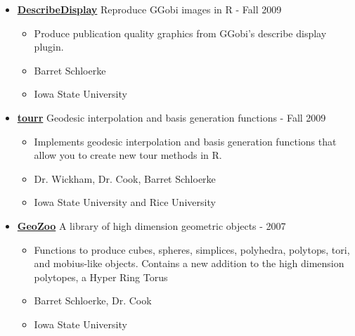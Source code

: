 \documentclass[oneside]{article}
\begin{document}
\begin{itemize}
      \item{\bf \href{http://github.com/ggobi/DescribeDisplay}{DescribeDisplay}} Reproduce GGobi images in R - Fall 2009
        \begin{itemize}
          \item Produce publication quality graphics from GGobi's describe display plugin.
          \item Barret Schloerke
          \item Iowa State University
        \end{itemize}


      \item{\bf \href{http://github.com/ggobi/tourr}{tourr}} Geodesic interpolation and basis generation functions - Fall 2009
        \begin{itemize}
          \item Implements geodesic interpolation and basis generation functions that allow you to create new tour methods in R.
          \item Dr. Wickham, Dr. Cook, Barret Schloerke
          \item Iowa State University and Rice University
        \end{itemize}


      \item{\bf \href{http://streaming.stat.iastate.edu/~dicook/geometric-data/}{GeoZoo}} A library of high dimension geometric objects - 2007
        \begin{itemize}
          \item Functions to produce cubes, spheres, simplices, polyhedra, polytops, tori, and mobius-like objects. Contains a new addition to the high dimension polytopes, a Hyper Ring Torus
          \item Barret Schloerke, Dr. Cook
          \item Iowa State University
        \end{itemize}


    \end{itemize}
\end{document}
